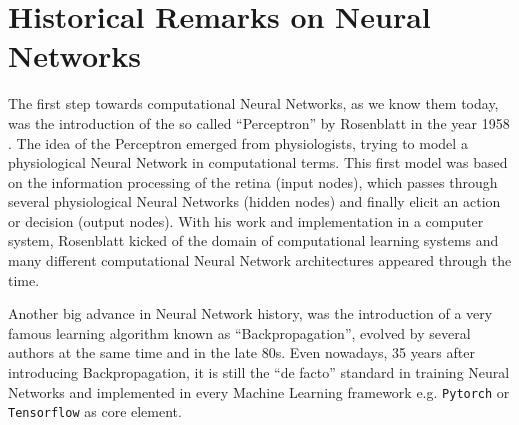 \section{Historical Remarks on Neural Networks}
The first step towards computational Neural Networks, as we know them today, was the introduction of the so called \enquote{Perceptron} by Rosenblatt in the year 1958 \cite{Rosenblatt1958}. 
The idea of the Perceptron emerged from physiologists, trying to model a physiological Neural Network in computational terms. 
This first model was based on the information processing of the retina (input nodes), which passes through several physiological Neural Networks (hidden nodes) and finally elicit an action or decision (output nodes).
With his work and implementation in a computer system, Rosenblatt kicked of the domain of computational learning systems and many different computational Neural Network architectures appeared through the time.

Another big advance in Neural Network history, was the introduction of a very famous learning algorithm known as \enquote{Backpropagation}, evolved by several authors at the same time \cite{LeCun1986} and \cite{Rumelhart1986} in the late 80s. Even nowadays, 35 years after introducing Backpropagation, it is still the \enquote{de facto} standard in training Neural Networks and implemented in every Machine Learning framework e.g. \texttt{Pytorch} or \texttt{Tensorflow} as core element.